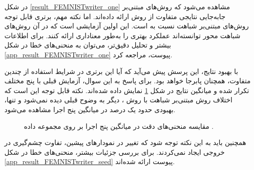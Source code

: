 در شکل
\ref{result_FEMNISTwriter_one}
مشاهده می‌شود که روش‌های مبتنی‌بر جابه‌جایی نتایجی متفاوت از روش
ارائه داده‌اند. اما نکته مهم، برتری قابل توجه روش‌های مبتنی‌بر شباهت نسبت به
است. این اولین آزمایشی است که در آن روش‌های شباهت محور توانسته‌اند عملکرد بهتری را به‌طور معناداری ارائه کنند. برای اطلاعات بیشتر و تحلیل دقیق‌تر، می‌توان به منحنی‌های خطا در شکل
\ref{app_result_FEMNISTwriter_one}
پیوست، مراجعه کرد.



با بهبود نتایج، این پرسش پیش می‌آید که آیا این برتری در شرایط استفاده از چندین
متفاوت، همچنان پابرجا خواهد بود. برای پاسخ به این سوال، آزمایش قبلی با پنج
مختلف تکرار شده و میانگین نتایج در شکل
\ref{result_FEMNISTwriter_seed}
نمایش داده شده‌اند. نکته قابل توجه این است که اختلاف روش مبتنی‌بر شباهت با روش
%
، دیگر به وضوح قبلی دیده نمی‌شود و تنها، بهبودی حدود یک درصد در میانگین پنج اجرا مشاهده می‌شود.
\begin{figure}[t!]
	\centering
	\hspace{0.8mm}
	\caption{
		مقایسه منحنی‌های دقت در میانگین پنج اجرا بر روی مجموعه داده
		.
	}
	\label{result_FEMNISTwriter_seed}
\end{figure}
همچنین باید به این نکته توجه شود که تغییر
در نمودارهای پیشین، تفاوت چشم‌گیری در خروجی ایجاد نمی‌کردند.
برای بررسی جزئیات بیشتر، منحنی‌های خطا در شکل
\ref{app_result_FEMNISTwriter_seed}
پیوست ارائه شده‌اند.


